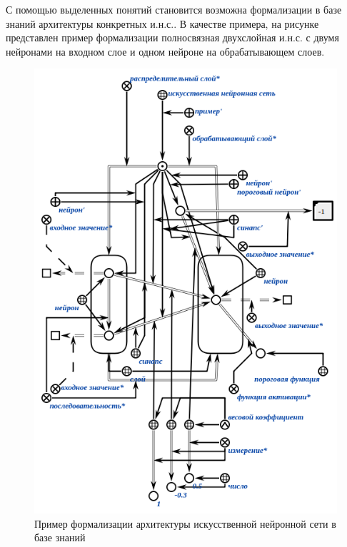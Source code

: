 \begin{SCn}
\end{SCn}

\begin{SCn}
\end{SCn}

С помощью выделенных понятий становится возможна формализации в базе знаний архитектуры конкретных и.н.с.. В качестве примера, на рисунке  представлен пример формализации полносвязная двухслойная и.н.с. с двумя нейронами на входном слое и одном нейроне на обрабатывающем слоев.

\begin{figure}
	\centering
	\includegraphics[width=0.8\linewidth]{author/part3/figures/neural_network_scg.png}
	\caption{Пример формализации архитектуры искусственной нейронной сети в базе знаний}
	\label{fig:neural_network_scg}
\end{figure}


